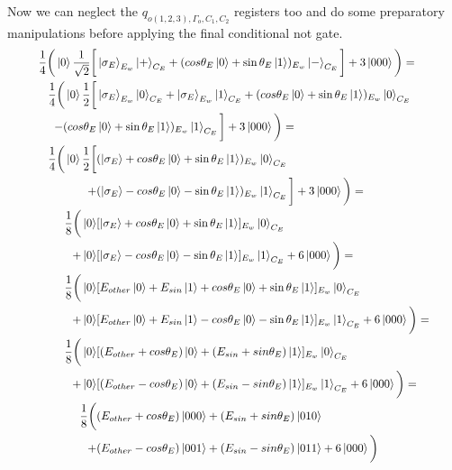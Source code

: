 \documentclass{article}
\begin{document}
\newpage
\noindent
Now we can neglect the $q_{o(1,2,3),\Gamma_o,C_1,C_2}$ registers too and do some preparatory manipulations before applying the final conditional not gate. 
\begin{equation}
   \resizebox{.9\hsize}{!}{$\begin{split}
        \frac{1}{4}\bigg(\ket{0}\frac{1}{\sqrt{2}}\bigg[&\ket{\sigma_E}_{E_w}\ket{+}_{C_E}+(cos\theta_E\ket{0}+\sin\theta_E\ket{1})_{E_w}\ket{-}_{C_E}\bigg]+3\ket{000}\bigg)=\\
        \frac{1}{4}\bigg(\ket{0}\frac{1}{2}\bigg[&\ket{\sigma_E}_{E_w}\ket{0}_{C_E}+\ket{\sigma_E}_{E_w}\ket{1}_{C_E}+(cos\theta_E\ket{0}+\sin\theta_E\ket{1})_{E_w}\ket{0}_{C_E}\\
        -(cos\theta_E&\ket{0}+\sin\theta_E\ket{1})_{E_w}\ket{1}_{C_E}\bigg]+3\ket{000}\bigg)=\\
        \frac{1}{4}\bigg(
        \ket{0}\frac{1}{2}\bigg[&
        (\ket{\sigma_E}+cos\theta_E\ket{0}+\sin\theta_E\ket{1})_{E_w}\ket{0}_{C_E}\\
        +&(\ket{\sigma_E}-cos\theta_E\ket{0}-\sin\theta_E\ket{1})_{E_w}\ket{1}_{C_E}
        \bigg]+3\ket{000}\bigg)=\\
        \frac{1}{8}\bigg(
        \ket{0}&
        [\ket{\sigma_E}+cos\theta_E\ket{0}+\sin\theta_E\ket{1}]_{E_w}\ket{0}_{C_E}\\
        +\ket{0}&[\ket{\sigma_E}-cos\theta_E\ket{0}-\sin\theta_E\ket{1}]_{E_w}\ket{1}_{C_E}
        +6\ket{000}\bigg)=\\
        \frac{1}{8}\bigg(
         \ket{0}&[E_{other}\ket{0}+E_{sin}\ket{1}+cos\theta_E\ket{0}+\sin\theta_E\ket{1}]_{E_w}\ket{0}_{C_E}\\
        +\ket{0}&[E_{other}\ket{0}+E_{sin}\ket{1}-cos\theta_E\ket{0}-\sin\theta_E\ket{1}]_{E_w}\ket{1}_{C_E}
        +6\ket{000}\bigg)=\\
        \frac{1}{8}\bigg(
        \ket{0}&[(E_{other}+cos\theta_E)\ket{0}+(E_{sin}+sin\theta_E)\ket{1}]_{E_w}\ket{0}_{C_E}\\
        +\ket{0}&[(E_{other}-cos\theta_E)\ket{0}+(E_{sin}-sin\theta_E)\ket{1}]_{E_w}\ket{1}_{C_E}
        +6\ket{000}\bigg)=\\
        \frac{1}{8}\bigg(
        &(E_{other}+cos\theta_E)\ket{000}+(E_{sin}+sin\theta_E)\ket{010}\\+
        &(E_{other}-cos\theta_E)\ket{001}+(E_{sin}-sin\theta_E)\ket{011}+6\ket{000}\bigg)\\
   \end{split}$}
\end{equation}
\end{document}
